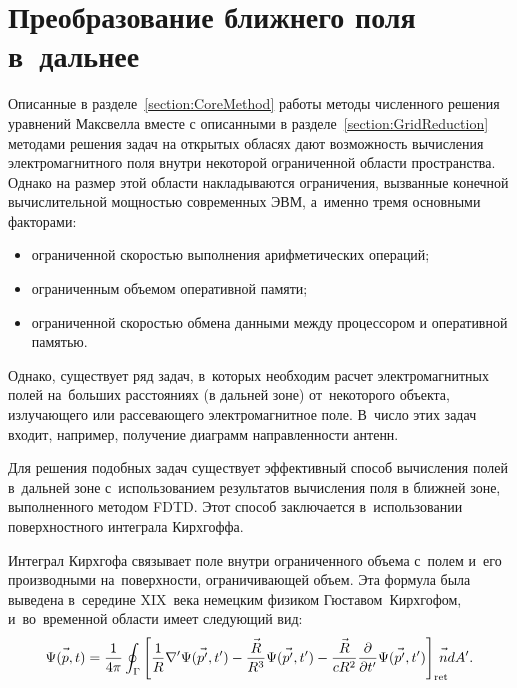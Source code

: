 

\section{Преобразование ближнего поля в~дальнее}

Описанные в разделе~\ref{section:CoreMethod} работы методы численного решения
уравнений Максвелла вместе с описанными в разделе~\ref{section:GridReduction}
методами решения задач на открытых обласях дают возможность вычисления
электромагнитного поля внутри некоторой ограниченной области пространства.
Однако на размер этой области накладываются ограничения, вызванные конечной
вычислительной мощностью современных ЭВМ, а~именно тремя основными факторами:
\begin{itemize}
\item ограниченной скоростью выполнения арифметических операций;
\item ограниченным объемом оперативной памяти;
\item ограниченной скоростью обмена данными между процессором
      и оперативной памятью.
\end{itemize}
Однако, существует ряд задач, в~которых необходим расчет электромагнитных полей
на~больших расстояниях (в дальней зоне) от~некоторого объекта, излучающего или
рассевающего электромагнитное поле. В~число этих задач входит, например,
получение диаграмм направленности антенн.

Для решения подобных задач существует эффективный способ вычисления полей
в~дальней зоне с~использованием результатов вычисления поля в ближней зоне,
выполненного методом FDTD. Этот способ заключается в~использовании
поверхностного интеграла Кирхгоффа.

Интеграл Кирхгофа связывает поле внутри ограниченного объема с~полем и~его
производными на~поверхности, ограничивающей объем. Эта формула была выведена
в~середине XIX~века немецким физиком Гюставом~Кирхгофом, и~во~временной области
имеет следующий вид:
\begin{equation}
    \label{eq:KirchhoffIntegral}
    \Psi(\vec{p\mathstrut},t) = \frac{1}{4\pi} \oint_\Gamma
    \left[
        \frac{1}{R}\nabla'\Psi(\vec{p'\mathstrut},t') -
        \frac{\vec{R\mathstrut}}{R^3}\Psi(\vec{p'\mathstrut},t') -
        \frac{\vec{R\mathstrut}}{cR^2}\frac{\partial}{\partial t'}\Psi(\vec{p'\mathstrut},t')
    \right]_\text{ret} \!\!\!\!\!\vec{n\mathstrut} dA'.
\end{equation}

